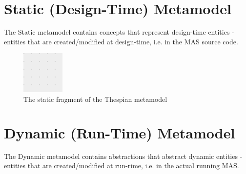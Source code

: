 \section{Static (Design-Time) Metamodel}	

The Static metamodel contains concepts that represent design-time entities - entities that are created/modified at design-time, i.e. in the MAS source code.

\begin{figure}[ht]
	\centering
	\includegraphics[width=\textwidth]{images/thespian-static-metamodel.png}
	\caption{The static fragment of the Thespian metamodel}
	\label{figure:thespian-static-metamodel}
\end{figure}

\section{Dynamic (Run-Time) Metamodel}

The Dynamic metamodel contains abstractions that abstract dynamic entities - entities that are created/modified at run-rime, i.e. in the actual running MAS.

